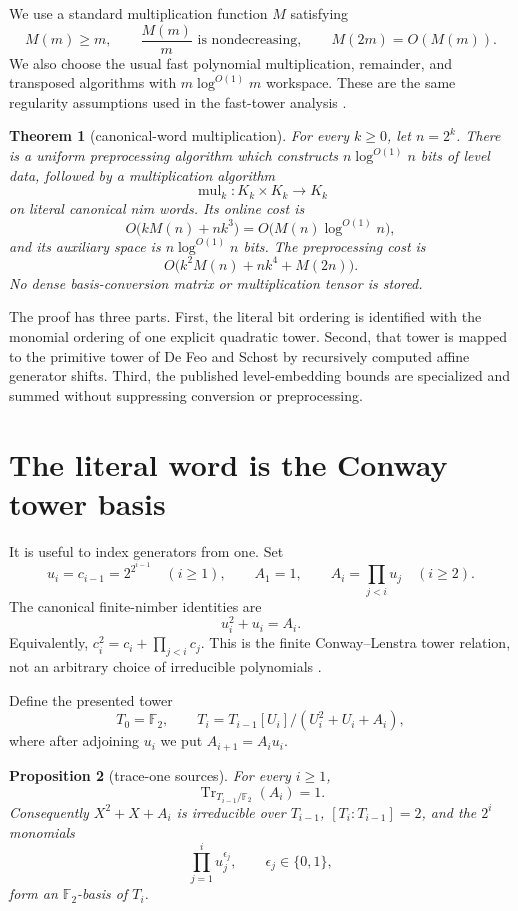 \documentclass[11pt]{article}
\newtheorem{theorem}{Theorem}[section]
\newtheorem{proposition}[theorem]{Proposition}
\theoremstyle{definition}
\theoremstyle{remark}
\newcommand{\F}{\mathbb F}
\newcommand{\Tr}{\operatorname{Tr}}
\begin{document}
We use a standard multiplication function $M$ satisfying
\[
  M(m)\geq m,
  \qquad
  \frac{M(m)}m\text{ is nondecreasing},
  \qquad
  M(2m)=O(M(m)).
\]
We also choose the usual fast polynomial multiplication, remainder, and
transposed algorithms with $m\log^{O(1)}m$ workspace.  These are the same
regularity assumptions used in the fast-tower analysis
\cite{defeoschost2012}.

\begin{theorem}[canonical-word multiplication]\label{thm:main}
For every $k\geq0$, let $n=2^k$.  There is a uniform preprocessing algorithm
which constructs $n\log^{O(1)}n$ bits of level data, followed by a
multiplication algorithm
\[
  \operatorname{mul}_k:K_k\times K_k\longrightarrow K_k
\]
on literal canonical nim words.  Its online cost is
\[
  O\bigl(kM(n)+nk^3\bigr)
  =O\bigl(M(n)\log^{O(1)}n\bigr),
\]
and its auxiliary space is $n\log^{O(1)}n$ bits.  The preprocessing cost is
\[
  O\bigl(k^2M(n)+nk^4+M(2n)\bigr).
\]
No dense basis-conversion matrix or multiplication tensor is stored.
\end{theorem}

The proof has three parts.  First, the literal bit ordering is identified with
the monomial ordering of one explicit quadratic tower.  Second, that tower is
mapped to the primitive tower of De Feo and Schost by recursively computed
affine generator shifts.  Third, the published level-embedding bounds are
specialized and summed without suppressing conversion or preprocessing.

\section{The literal word is the Conway tower basis}

It is useful to index generators from one.  Set
\[
  u_i=c_{i-1}=2^{2^{i-1}}
  \quad (i\geq1),
  \qquad
  A_1=1,
  \qquad
  A_i=\prod_{j<i}u_j\quad(i\geq2).
\]
The canonical finite-nimber identities are
\begin{equation}
  u_i^2+u_i=A_i.
\end{equation}
Equivalently, $c_i^2=c_i+\prod_{j<i}c_j$.  This is the finite
Conway--Lenstra tower relation, not an arbitrary choice of irreducible
polynomials \cite{conway1976,lenstra1978}.

Define the presented tower
\[
  T_0=\F_2,
  \qquad
  T_i=T_{i-1}[U_i]/(U_i^2+U_i+A_i),
\]
where after adjoining $u_i$ we put $A_{i+1}=A_i u_i$.

\begin{proposition}[trace-one sources]\label{prop:trace-one}
For every $i\geq1$,
\[
  \Tr_{T_{i-1}/\F_2}(A_i)=1.
\]
Consequently $X^2+X+A_i$ is irreducible over $T_{i-1}$,
$[T_i:T_{i-1}]=2$, and the $2^i$ monomials
\[
  \prod_{j=1}^i u_j^{\epsilon_j},
  \qquad \epsilon_j\in\{0,1\},
\]
form an $\F_2$-basis of $T_i$.
\end{proposition}
\end{document}

